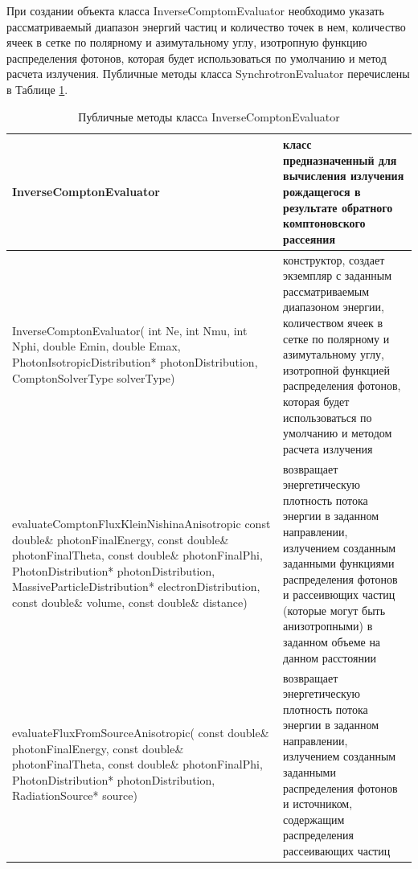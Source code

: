 При создании объекта класса InverseComptomEvaluator необходимо указать рассматриваемый диапазон энергий частиц и количество точек в нем, количество ячеек в сетке по полярному и азимутальному углу, изотропную функцию распределения фотонов, которая будет использоваться по умолчанию и метод расчета излучения. Публичные методы класса SynchrotronEvaluator перечислены в Таблице \ref{InverseComptonEvaluator}.
\begin{table}[h]
	\begin{center}
		\begin{small}
	\caption{Публичные методы классa InverseComptonEvaluator }
	\label{InverseComptonEvaluator}
	\begin{tabularx}{\textwidth}{|X|X|} 
		\hline
		\textbf{InverseComptonEvaluator} & класс предназначенный для вычисления излучения рождащегося в результате обратного комптоновского рассеяния\\
		\hline
		InverseComptonEvaluator( int Ne, int Nmu, int Nphi, double Emin, double Emax, PhotonIsotropicDistribution* photonDistribution, ComptonSolverType solverType) & конструктор, создает экземпляр с заданным рассматриваемым диапазоном энергии, количеством ячеек в сетке по полярному и азимутальному углу, изотропной функцией распределения фотонов, которая будет использоваться по умолчанию и методом расчета излучения\\
		\hline
		evaluateComptonFluxKleinNishinaAnisotropic const double\& photonFinalEnergy, const double\& photonFinalTheta, const double\& photonFinalPhi, PhotonDistribution* photonDistribution, MassiveParticleDistribution* electronDistribution, const double\& volume, const double\& distance) & возвращает энергетическую плотность потока энергии в заданном направлении, излучением созданным заданными функциями распределения фотонов и рассеивющих частиц (которые могут быть анизотропными) в заданном объеме на данном расстоянии\\
		\hline
		evaluateFluxFromSourceAnisotropic( const double\& photonFinalEnergy, const double\& photonFinalTheta, const double\& photonFinalPhi, PhotonDistribution* photonDistribution, RadiationSource* source) & возвращает энергетическую плотность потока энергии в заданном направлении, излучением созданным заданными распределения фотонов и источником, содержащим распределения рассеивающих частиц\\
		\hline
	\end{tabularx}
\end{small}
\end{center}
\end{table}

